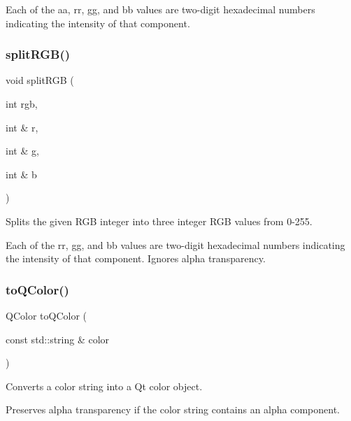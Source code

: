Each of the {\ttfamily aa}, {\ttfamily rr}, {\ttfamily gg}, and {\ttfamily bb} values are two-\/digit hexadecimal numbers indicating the intensity of that component. \mbox{\label{classGColor_a32dea18e982a160b7b1ce8b4e881c0f9}} 
\subsubsection{\texorpdfstring{split\+R\+G\+B()}{splitRGB()}}
{\footnotesize\ttfamily void split\+R\+GB (\begin{DoxyParamCaption}\item[{int}]{rgb,  }\item[{int \&}]{r,  }\item[{int \&}]{g,  }\item[{int \&}]{b }\end{DoxyParamCaption})\hspace{0.3cm}{\ttfamily [static]}}



Splits the given R\+GB integer into three integer R\+GB values from 0-\/255. 

Each of the {\ttfamily rr}, {\ttfamily gg}, and {\ttfamily bb} values are two-\/digit hexadecimal numbers indicating the intensity of that component. Ignores alpha transparency. \mbox{\label{classGColor_a23f62da01b905b62266904a01cfb3745}} 
\subsubsection{\texorpdfstring{to\+Q\+Color()}{toQColor()}}
{\footnotesize\ttfamily Q\+Color to\+Q\+Color (\begin{DoxyParamCaption}\item[{const std\+::string \&}]{color }\end{DoxyParamCaption})\hspace{0.3cm}{\ttfamily [static]}}



Converts a color string into a Qt color object. 

Preserves alpha transparency if the color string contains an alpha component. \mbox{\label{classGColor_a979586dd4aaf299d42cf19619ee89280}} 
